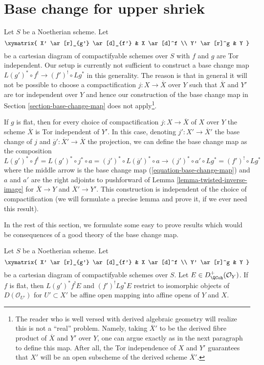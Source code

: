 \section{Base change for upper shriek}
\label{section-base-change-shriek}

\noindent
Let $S$ be a Noetherian scheme. Let
$$
\xymatrix{
X' \ar[r]_{g'} \ar[d]_{f'} & X \ar[d]^f \\
Y' \ar[r]^g & Y
}
$$
be a cartesian diagram of compactifyable schemes over $S$ with
$f$ and $g$ are Tor independent. Our setup is currently
not sufficient to construct a base change map
$L(g')^* \circ f^! \to (f')^! \circ Lg^*$ in this generality.
The reason is that in general it will not be possible to choose
a compactification $j : X \to \overline{X}$ over $Y$ such that
$\overline{X}$ and $Y'$ are tor independent over $Y$ and hence
our construction of the base change map in
Section \ref{section-base-change-map} does not apply\footnote{
The reader who is well versed with derived algebraic geometry
will realize this is not a ``real'' problem. Namely, taking
$\overline{X}'$ to be the derived fibre product of
$\overline{X}$ and $Y'$ over $Y$, one can argue exactly as in
the next paragraph to define this map. After all, the Tor independence
of $X$ and $Y'$ guarantees that $X'$ will be an open subscheme
of the derived scheme $\overline{X}'$.}.

\medskip\noindent
If $g$ is flat, then for every choice of
compactification $j : X \to \overline{X}$ of $X$ over $Y$
the scheme $\overline{X}$ is Tor independent of $Y'$.
In this case, denoting $j' : X' \to \overline{X}'$ the
base change of $j$ and $\overline{g}' : \overline{X}' \to \overline{X}$
the projection, we can define the base change map
as the composition
$$
L(g')^* \circ f^! = L(g')^* \circ j^* \circ a =
(j')^* \circ L(\overline{g}')^* \circ a \longrightarrow
(j')^* \circ a' \circ Lg^* = (f')^! \circ Lg^*
$$
where the middle arrow is the base change map
(\ref{equation-base-change-map})
and $a$ and $a'$ are the right adjoints to pushforward
of Lemma \ref{lemma-twisted-inverse-image}
for $\overline{X} \to Y$ and $\overline{X}' \to Y'$.
This construction is independent of the choice of
compactification (we will formulate a precise lemma
and prove it, if we ever need this result).

\medskip\noindent
In the rest of this section, we formulate some easy to prove
results which would be consequences of a good theory of the
base change map.

\begin{lemma}
\label{lemma-base-change-locally}
Let $S$ be a Noetherian scheme. Let
$$
\xymatrix{
X' \ar[r]_{g'} \ar[d]_{f'} & X \ar[d]^f \\
Y' \ar[r]^g & Y
}
$$
be a cartesian diagram of compactifyable schemes over $S$.
Let $E \in D^+_\QCoh(\mathcal{O}_Y)$.
If $f$ is flat, then $L(g')^*f^!E$ and $(f')^!Lg^*E$
restrict to isomorphic objects of $D(\mathcal{O}_{U'})$
for $U' \subset X'$ be affine open mapping into affine opens of $Y$ and $X$.
\end{lemma}

